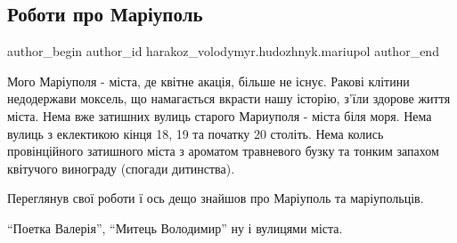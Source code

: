  
 
 
 
 

\subsection{Роботи про Маріуполь}
\label{sec:26_03_2022.fb.harakoz_volodymyr.hudozhnyk.mariupol.1.roboty_pro_mariupol}

\ifcmt
 author_begin
   author_id harakoz_volodymyr.hudozhnyk.mariupol
 author_end
\fi

Мого Маріуполя - міста, де квітне акація, більше не існує. Ракові клітини
недодержави моксель, що намагається вкрасти нашу історію, з'їли здорове життя
міста.  Нема вже затишних вулиць старого Мариуполя - міста біля моря. Нема
вулиць з еклектикою кінця 18, 19 та початку 20 століть. Нема колись
провінційного затишного міста  з ароматом  травневого бузку та тонким запахом
квітучого винограду (спогади дитинства).

Переглянув свої роботи ї ось дещо знайшов  про Маріуполь та маріупольців.

\enquote{Поетка Валерія}, \enquote{Митець Володимир} ну і вулицями міста.

